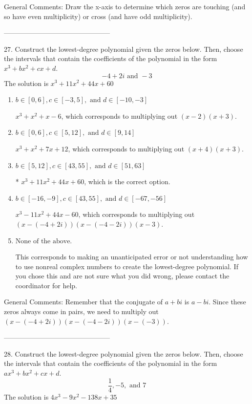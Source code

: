 \documentclass{article}[14pt]
\begin{document}
General Comments: Draw the x-axis to determine which zeros are touching (and so have even multiplicity) or cross (and have odd multiplicity).

-----------------------------------------------

27. Construct the lowest-degree polynomial given the zeros below. Then, choose the intervals that contain the coefficients of the polynomial in the form $x^3+bx^2+cx+d$.
$$ -4 + 2i \text{ and } -3 $$ 
The solution is $ x^{3} +11 x^{2} +44 x + 60 $ 

\begin{enumerate}[label=\Alph*.] 
\item $ b \in [0, 6], c \in [-3, 5], \text{ and } d \in [-10, -3] $ 

 $x^{3} + x^{2} +x -6$, which corresponds to multiplying out $(x -2)(x + 3)$. 
\item $ b \in [0, 6], c \in [5, 12], \text{ and } d \in [9, 14] $ 

 $x^{3} + x^{2} +7 x + 12$, which corresponds to multiplying out $(x + 4)(x + 3)$. 
\item $ b \in [5, 12], c \in [43, 55], \text{ and } d \in [51, 63] $ 

 * $x^{3} +11 x^{2} +44 x + 60$, which is the correct option. 
\item $ b \in [-16, -9], c \in [43, 55], \text{ and } d \in [-67, -56] $ 

 $x^{3} -11 x^{2} +44 x -60$, which corresponds to multiplying out $(x-(-4 + 2i))(x-(-4 - 2i))(x -3)$. 
\item $ \text{None of the above.} $ 

 This corresponds to making an unanticipated error or not understanding how to use nonreal complex numbers to create the lowest-degree polynomial. If you chose this and are not sure what you did wrong, please contact the coordinator for help. 
\end{enumerate} 
 
General Comments: Remember that the conjugate of $a+bi$ is $a-bi$. Since these zeros always come in pairs, we need to multiply out $(x-(-4 + 2i))(x-(-4 - 2i))(x-(-3))$.

-----------------------------------------------

28. Construct the lowest-degree polynomial given the zeros below. Then, choose the intervals that contain the coefficients of the polynomial in the form $ax^3+bx^2+cx+d$.
$$ \frac{1}{4}, -5, \text{ and } 7 $$ 
The solution is $ 4x^{3} -9 x^{2} -138 x + 35 $ 
\end{document}

